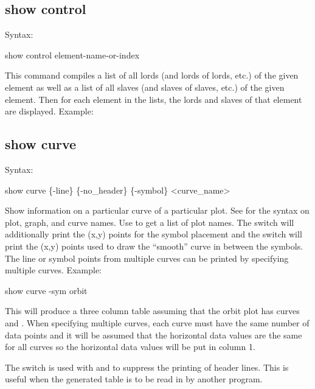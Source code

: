 {{{{{{{{\subsection{show control}
\label{s:show.control}

Syntax:
\begin{example}
  show control {element-name-or-index}
\end{example}

This command compiles a list of all lords (and lords of lords, etc.) of the given element as well as
a list of all slaves (and slaves of slaves, etc.) of the given element. Then for each element in the
lists, the lords and slaves of that element are displayed. Example:


\subsection{show curve}
\label{s:show.curve}

Syntax:
\begin{example}
  show curve \{-line\} \{-no_header\} \{-symbol\} <curve_name>
\end{example}

Show information on a particular curve of a particular plot. See  for the syntax on
plot, graph, and curve names.  Use  to get a list of plot names. The 
switch will additionally print the (x,y) points for the symbol placement and the  switch
will print the (x,y) points used to draw the ``smooth'' curve in between the symbols. The line or
symbol points from multiple curves can be printed by specifying multiple curves. Example:
\begin{example}
  show curve -sym orbit
\end{example}
This will produce a three column table assuming that the orbit plot has curves  and
. When specifying multiple curves, each curve must have the same number of data
points and it will be assumed that the horizontal data values are the same for all curves so the
horizontal data values will be put in column 1.

The  switch is used with  and  to suppress the printing of
header lines. This is useful when the generated table is to be read in by another program.

}}}}}}}}
